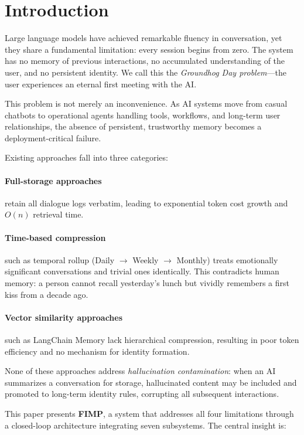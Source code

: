 \documentclass[11pt,a4paper]{article}
\begin{document}
\section{Introduction}

Large language models have achieved remarkable fluency in conversation, yet they share a
fundamental limitation: every session begins from zero. The system has no memory of previous
interactions, no accumulated understanding of the user, and no persistent identity. We call
this the \emph{Groundhog Day problem}---the user experiences an eternal first meeting with
the AI.

This problem is not merely an inconvenience. As AI systems move from casual chatbots to
operational agents handling tools, workflows, and long-term user relationships, the absence
of persistent, trustworthy memory becomes a deployment-critical failure.

Existing approaches fall into three categories:

\paragraph{Full-storage approaches} retain all dialogue logs verbatim, leading to exponential
token cost growth and $O(n)$ retrieval time.

\paragraph{Time-based compression} such as temporal rollup (Daily $\to$ Weekly $\to$ Monthly)
treats emotionally significant conversations and trivial ones identically. This contradicts
human memory: a person cannot recall yesterday's lunch but vividly remembers a first kiss
from a decade ago.

\paragraph{Vector similarity approaches} such as LangChain Memory lack hierarchical
compression, resulting in poor token efficiency and no mechanism for identity formation.

None of these approaches address \emph{hallucination contamination}: when an AI summarizes a
conversation for storage, hallucinated content may be included and promoted to long-term
identity rules, corrupting all subsequent interactions.

This paper presents \textbf{FIMP}, a system that addresses all four limitations through a
closed-loop architecture integrating seven subsystems. The central insight is:
\end{document}
